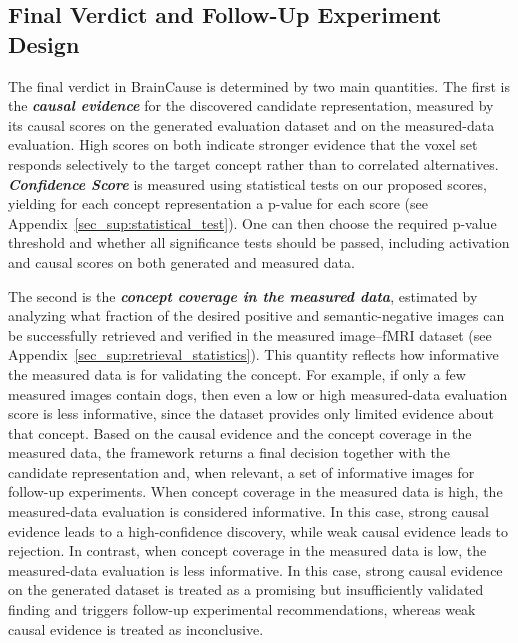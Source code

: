 \documentclass{article}
\begin{document}
\subsection{Final Verdict and Follow-Up Experiment Design}
\label{sec:method:Steps:Final}

The final verdict in BrainCause is determined by two main quantities. The first is the \emph{\textbf{causal evidence}} for the discovered candidate representation, measured by its causal scores on the generated evaluation dataset and on the measured-data evaluation. High scores on both indicate stronger evidence that the voxel set responds selectively to the target concept rather than to correlated alternatives.
\emph{\textbf{Confidence Score}} is measured using statistical tests on our proposed scores, yielding for each concept representation a p-value for each score (see Appendix~\ref{sec_sup:statistical_test}). One can then choose the required p-value threshold and whether all significance tests should be passed, including activation and causal scores on both generated and measured data.

The second is the \emph{\textbf{concept coverage in the measured data}}, estimated by analyzing what fraction of the desired positive and semantic-negative images can be successfully retrieved and verified in the measured image--fMRI dataset (see Appendix~\ref{sec_sup:retrieval_statistics}). This quantity reflects how informative the measured data is for validating the concept. For example, if only a few measured images contain dogs, then even a low or high measured-data evaluation score is less informative, since the dataset provides only limited evidence about that concept.
Based on the causal evidence and the concept coverage in the measured data, the framework returns a final decision together with the candidate representation and, when relevant, a set of informative images for follow-up experiments. 
When concept coverage in the measured data is high, the measured-data evaluation is considered informative. In this case, strong causal evidence leads to a high-confidence discovery, while weak causal evidence leads to rejection. In contrast, when concept coverage in the measured data is low, the measured-data evaluation is less informative. In this case, strong causal evidence on the generated dataset is treated as a promising but insufficiently validated finding and triggers follow-up experimental recommendations, whereas weak causal evidence is treated as inconclusive.
\end{document}
